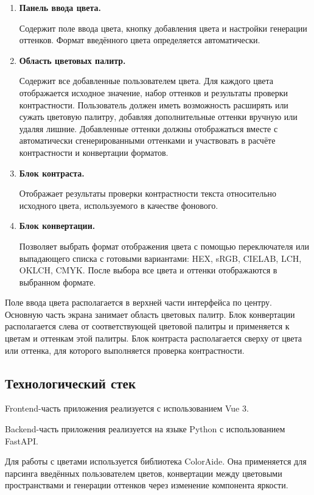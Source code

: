 \begin{enumerate}
    \item \textbf{Панель ввода цвета.}

    Содержит поле ввода цвета, кнопку добавления цвета и настройки генерации оттенков. Формат введённого цвета определяется автоматически.

    \item \textbf{Область цветовых палитр.}

    Содержит все добавленные пользователем цвета. Для каждого цвета отображается исходное значение, набор оттенков и результаты проверки контрастности. Пользователь должен иметь возможность расширять или сужать цветовую палитру, добавляя дополнительные оттенки вручную или удаляя лишние. Добавленные оттенки должны отображаться вместе с автоматически сгенерированными оттенками и участвовать в расчёте контрастности и конвертации форматов.

    \item \textbf{Блок контраста.}

    Отображает результаты проверки контрастности текста относительно исходного цвета, используемого в качестве фонового.

    \item \textbf{Блок конвертации.}

    Позволяет выбрать формат отображения цвета с помощью переключателя или выпадающего списка с готовыми вариантами: HEX, sRGB, CIELAB, LCH, OKLCH, CMYK. После выбора все цвета и оттенки отображаются в выбранном формате.
\end{enumerate}

Поле ввода цвета располагается в верхней части интерфейса по центру. Основную часть экрана занимает область цветовых палитр. Блок конвертации располагается слева от соответствующей цветовой палитры и применяется к цветам и оттенкам этой палитры. Блок контраста располагается сверху от цвета или оттенка, для которого выполняется проверка контрастности.

\subsection*{Технологический стек}

Frontend-часть приложения реализуется с использованием Vue 3.

Backend-часть приложения реализуется на языке Python с использованием FastAPI.

Для работы с цветами используется библиотека ColorAide. Она применяется для парсинга введённых пользователем цветов, конвертации между цветовыми пространствами и генерации оттенков через изменение компонента яркости.

